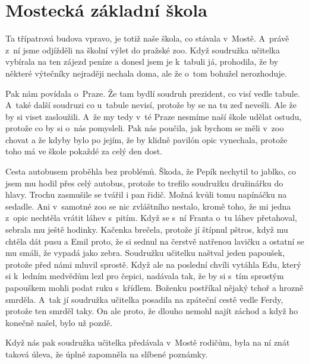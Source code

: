 
\chapter{Mostecká základní škola}


Ta třípatrová budova vpravo, je totiž naše škola, co stávala v~Mostě. A~právě
z~ní jsme odjížděli na školní výlet do pražské zoo. Když soudružka učitelka
vybírala na ten zájezd peníze a donesl jsem je k~tabuli já, prohodila, že by
některé výtečníky nejraději nechala doma, ale že o~tom bohužel nerozhoduje.

Pak nám povídala o~Praze. Že tam bydlí soudruh prezident, co visí vedle tabule.
A~také další soudruzi co u~tabule nevisí, protože by se na tu zeď nevešli. Ale
že by si viset zasloužili. A~že my tedy v~té Praze nesmíme naší škole udělat
ostudu, protože co by si o~nás pomysleli. Pak nás poučila, jak bychom se měli
v~zoo chovat a že kdyby bylo po jejím, že by klidně pavilón opic vynechala,
protože toho má ve škole pokaždé za celý den dost.

Cesta autobusem proběhla bez problémů. Škoda, že Pepík nechytil to jablko, co
jsem mu hodil přes celý autobus, protože to trefilo soudružku družinářku do
hlavy. Trochu zasmušile se tvářil i pan řidič. Možná kvůli tomu napínáčku na
sedadle. Ani v~samotné zoo se nic zvláštního nestalo, kromě toho, že mi jedna
z~opic nechtěla vrátit láhev s~pitím. Když se s~ní Franta o~tu láhev
přetahoval, sebrala mu ještě hodinky. Kačenka brečela, protože jí štípnul
pštros, když mu chtěla dát pusu a Emil proto, že si sednul na čerstvě natřenou
lavičku a ostatní se mu smáli, že vypadá jako zebra. Soudružku učitelku naštval
jeden papoušek, protože před námi mluvil sprostě. Když ale na poslední chvíli
vytáhla Edu, který si k~ledním medvědům lezl pro čepici, nadávala tak, že by si
s~tím sprostým papouškem mohli podat ruku s~křídlem. Boženku postříkal nějaký
tchoř a hrozně smrděla. A~tak jí soudružka učitelka posadila na zpáteční cestě
vedle Ferdy, protože ten smrděl taky. On ale proto, že dlouho nemohl najít
záchod a když ho konečně našel, bylo už pozdě.

Když nás pak soudružka učitelka předávala v~Mostě rodičům, byla na ní znát
taková úleva, že úplně zapomněla na slíbené poznámky.

